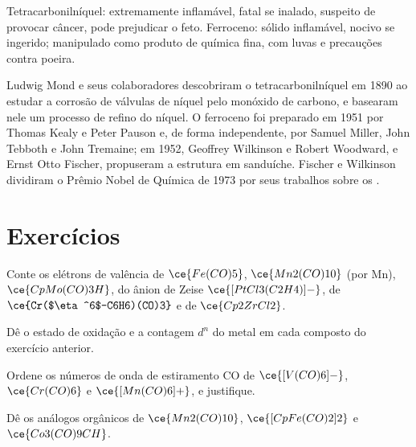 \begin{safety}{}
Tetracarbonilníquel: extremamente inflamável, fatal se inalado, suspeito de provocar câncer,
pode prejudicar o feto. Ferroceno: sólido inflamável, nocivo se ingerido;
manipulado como produto de química fina, com luvas e precauções contra poeira.
\end{safety}

\begin{history}
Ludwig Mond e seus colaboradores descobriram o tetracarbonilníquel em 1890 ao
estudar a corrosão de válvulas de níquel pelo monóxido de carbono, e basearam nele um
processo de refino do níquel. O ferroceno foi preparado em 1951 por Thomas Kealy e Peter
Pauson e, de forma independente, por Samuel Miller, John Tebboth e John Tremaine; em 1952,
Geoffrey Wilkinson e Robert Woodward, e Ernst Otto Fischer, propuseram a
estrutura em sanduíche. Fischer e Wilkinson dividiram o Prêmio Nobel de Química de 1973
por seus trabalhos sobre os .
\end{history}

\section{Exercícios}

\begin{exercise}[$\star$]\label{exo:b3:organometallic-bonding:1}
Conte os elétrons de valência de $\ce{Fe(CO)5}$, $\ce{Mn2(CO)10}$ (por Mn), $\ce{CpMo(CO)3H}$, do ânion de Zeise
$\ce{[PtCl3(C2H4)]-}$, de $\ce{Cr($\eta^6$-C6H6)(CO)3}$ e de $\ce{Cp2ZrCl2}$.
\end{exercise}

\begin{exercise}[$\star$]\label{exo:b3:organometallic-bonding:2}
Dê o estado de oxidação e a contagem $d^n$ do metal em cada composto do
exercício anterior.
\end{exercise}

\begin{exercise}[$\star$]\label{exo:b3:organometallic-bonding:3}
Ordene os números de onda de estiramento CO de $\ce{[V(CO)6]-}$, $\ce{Cr(CO)6}$ e $\ce{[Mn(CO)6]+}$, e justifique.
\end{exercise}

\begin{exercise}[$\star$]\label{exo:b3:organometallic-bonding:4}
Dê os análogos  orgânicos de $\ce{Mn2(CO)10}$, $\ce{[CpFe(CO)2]2}$ e $\ce{Co3(CO)9CH}$.
\end{exercise}

